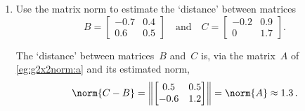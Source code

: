 \begin{example} \label{eg:}
\begin{enumerate}
\item Use the matrix norm to estimate the `distance' between matrices
\begin{equation*}
B=\begin{bmatrix} {-0.7}&{0.4}\\{0.6}&{0.5} \end{bmatrix}
\quad\text{and}\quad
C=\begin{bmatrix} -0.2&0.9\\0&1.7 \end{bmatrix}.
\end{equation*}
\begin{solution} 
The `distance' between matrices~\(B\) and~\(C\) is, via the matrix~\(A\) of \autoref{eg:g2x2norm:a} and its estimated norm,
\begin{equation*}
\norm{C-B}=\left\|\begin{bmatrix} 0.5&0.5\\-0.6&1.2 \end{bmatrix}\right\|
=\norm{A}\approx 1.3\,.
\end{equation*} 
\end{solution}



\end{enumerate}
\end{example}
